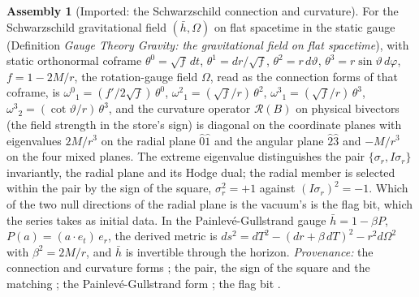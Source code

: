 \documentclass[11pt]{article}
\theoremstyle{definition}
\newtheorem{assembled}[theorem]{Assembly}
\theoremstyle{plain}
\providecommand{\hb}{}\renewcommand{\hb}{\bar{h}}
\begin{document}
\begin{assembled}[Imported: the Schwarzschild connection and curvature]\label{c:pairing.imported-schwarzschild-connection-curvature}
For the Schwarzschild gravitational field $(\hb, \Omega)$ on flat spacetime in the static gauge (Definition \emph{Gauge Theory Gravity: the gravitational field on flat spacetime}), with static orthonormal coframe $\theta^{0} = \sqrt f\,dt$, $\theta^{1} = dr/\sqrt f$, $\theta^{2} = r\,d\vartheta$, $\theta^{3} = r\sin\vartheta\,d\varphi$, $f = 1 - 2M/r$, the rotation-gauge field $\Omega$, read as the connection forms of that coframe, is $\omega^{0}{}_{1} = (f'/2\sqrt f)\,\theta^{0}$, $\omega^{2}{}_{1} = (\sqrt f/r)\,\theta^{2}$, $\omega^{3}{}_{1} = (\sqrt f/r)\,\theta^{3}$, $\omega^{3}{}_{2} = (\cot\vartheta/r)\,\theta^{3}$, and the curvature operator $\mathcal{R}(B)$ on physical bivectors (the field strength in the store's sign) is diagonal on the coordinate planes with eigenvalues $2M/r^{3}$ on the radial plane $\hat0\hat1$ and the angular plane $\hat2\hat3$ and $-M/r^{3}$ on the four mixed planes. The extreme eigenvalue distinguishes the pair $\{\sigma_{r}, I\sigma_{r}\}$ invariantly, the radial plane and its Hodge dual; the radial member is selected within the pair by the sign of the square, $\sigma_{r}^{2} = +1$ against $(I\sigma_{r})^{2} = -1$. Which of the two null directions of the radial plane is the vacuum's is the flag bit, which the series takes as initial data. In the Painlev\'e-Gullstrand gauge $\hb = 1 - \beta P$, $P(a) = (a \cdot e_{t})\,e_{r}$, the derived metric is $ds^{2} = dT^{2} - (dr + \beta\,dT)^{2} - r^{2}d\Omega^{2}$ with $\beta^{2} = 2M/r$, and $\hb$ is invertible through the horizon. \emph{Provenance:} the connection and curvature forms \cite[App.~A.2]{ButlerT5}; the pair, the sign of the square and the matching \cite[Thm.~6.1, Prop.~7.21(3)]{ButlerT5}; the Painlev\'e-Gullstrand form \cite[App.~A.1]{ButlerT5}; the flag bit \cite[Def.~2.10, Prop.~5.1]{ButlerT14}.
\end{assembled}
\end{document}
